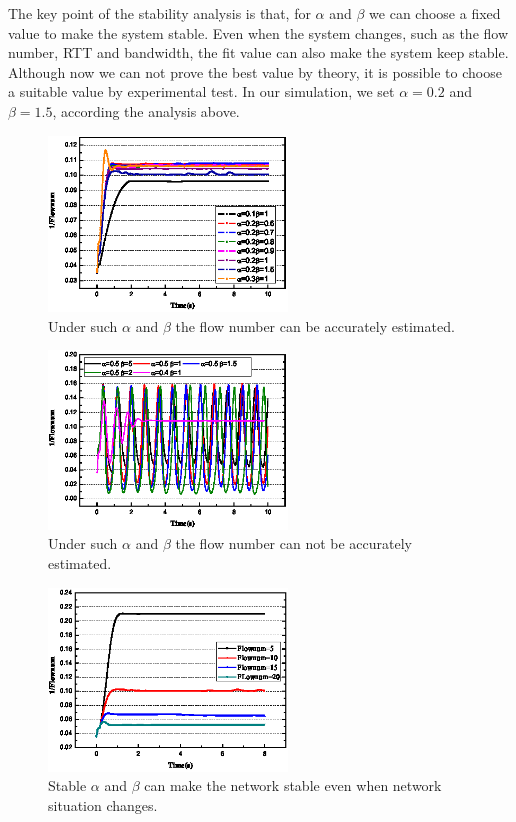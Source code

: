 The key point of the stability analysis is that, for $\alpha$ and $\beta$ we can choose a fixed value to make the system stable. Even when the system changes, such as the flow number, RTT and bandwidth, the fit value can also make the system keep stable. Although now we can not prove the best value by theory, it is possible to choose a suitable value by experimental test. In our simulation, we set $\alpha = 0.2$ and $\beta = 1.5$, according the analysis above.

\begin{figure}[t]
\centering
\includegraphics[width=2.5in]{ab-pic-cut.eps}
\caption{Under such $\alpha$ and $\beta$ the flow number can be accurately estimated.}
\label{fig-ab}
\end{figure}

\begin{figure}[t]
\centering
\includegraphics[width=2.5in]{abwrong-pic-cut.eps}
\caption{Under such $\alpha$ and $\beta$ the flow number can not be accurately estimated.}
\label{fig-abwrong}
\end{figure}

\begin{figure}[t]
\centering
\includegraphics[width=2.5in]{abflownum-pic-cut.eps}
\caption{Stable $\alpha$ and $\beta$ can make the network stable even when network situation changes.}
\label{fig-abflownum}
\end{figure}
